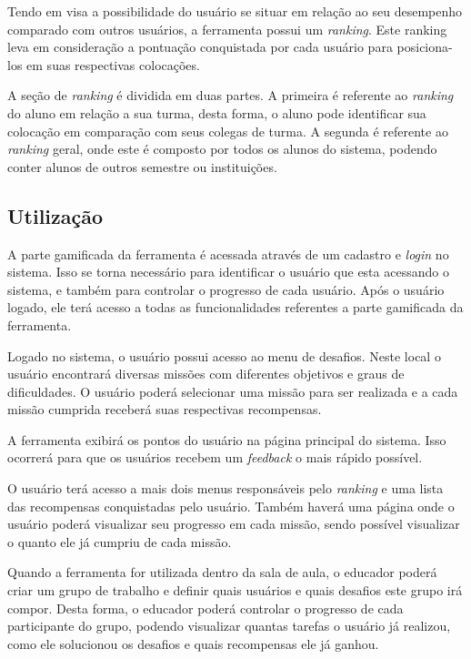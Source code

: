 \documentclass[
	12pt,				%
	oneside,			%
	a4paper,			%
	english,			%
	french,				%
	spanish,			%
	brazil,				%
	]{abntex2}
\begin{document}
Tendo em visa a possibilidade do usuário se situar em relação ao seu desempenho comparado com outros usuários, a ferramenta possui um \textit{ranking}. Este ranking leva em consideração a pontuação conquistada por cada usuário para posiciona-los em suas respectivas colocações.

A seção de \textit{ranking} é dividida em duas partes. A primeira é referente ao \textit{ranking} do aluno em relação a sua turma, desta forma, o aluno pode identificar sua colocação em comparação com seus colegas de turma. A segunda é referente ao \textit{ranking} geral, onde este é composto por todos os alunos do sistema, podendo conter alunos de outros semestre ou instituições.

\subsection{Utilização}

A parte gamificada da ferramenta é acessada através de um cadastro e \textit{login} no sistema. Isso se torna necessário para identificar o usuário que esta acessando o sistema, e também para controlar o progresso de cada usuário. Após o usuário logado, ele terá acesso a todas as funcionalidades referentes a parte gamificada da ferramenta.

Logado no sistema, o usuário possui acesso ao menu de desafios. Neste local o usuário encontrará diversas missões com diferentes objetivos e graus de dificuldades. O usuário poderá selecionar uma missão para ser realizada e a cada missão cumprida receberá suas respectivas recompensas.

A ferramenta exibirá os pontos do usuário na página principal do sistema. Isso ocorrerá para que os usuários recebem um \textit{feedback} o mais rápido possível.

O usuário terá acesso a mais dois menus responsáveis pelo \textit{ranking} e uma lista das recompensas conquistadas pelo usuário. Também haverá uma página onde o usuário poderá visualizar seu progresso em cada missão, sendo possível visualizar o quanto ele já cumpriu de cada missão.

Quando a ferramenta for utilizada dentro da sala de aula, o educador poderá criar um grupo de trabalho e definir quais usuários e quais desafios este grupo irá compor. Desta forma, o educador poderá controlar o progresso de cada participante do grupo, podendo visualizar quantas tarefas o usuário já realizou, como ele solucionou os desafios e quais recompensas ele já ganhou.
\end{document}
